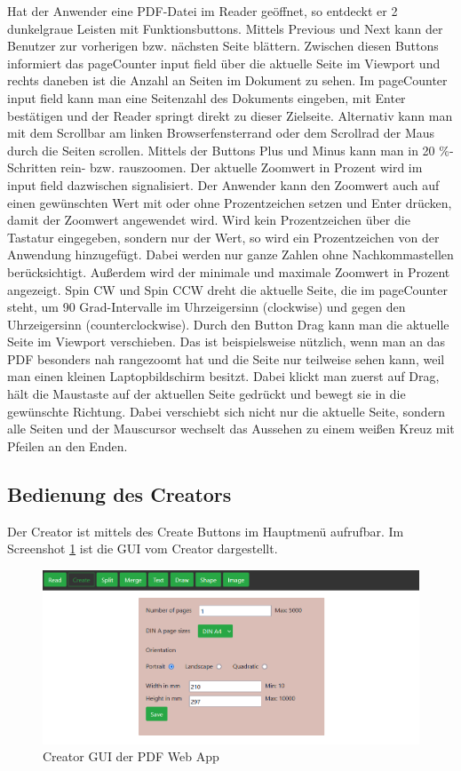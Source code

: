 Hat der Anwender eine PDF-Datei im Reader geöffnet, so entdeckt er 2 dunkelgraue Leisten mit Funktionsbuttons. Mittels Previous und Next kann der Benutzer zur vorherigen bzw. nächsten Seite blättern. Zwischen diesen Buttons informiert das pageCounter input field über die aktuelle Seite im Viewport und rechts daneben ist die Anzahl an Seiten im Dokument zu sehen. Im pageCounter input field kann man eine Seitenzahl des Dokuments eingeben, mit Enter bestätigen und der Reader springt direkt zu dieser Zielseite. Alternativ kann man mit dem Scrollbar am linken Browserfensterrand oder dem Scrollrad der Maus durch die Seiten scrollen. Mittels der Buttons Plus und Minus kann man in 20 \%-Schritten rein- bzw. rauszoomen. Der aktuelle Zoomwert in Prozent wird im input field dazwischen signalisiert. Der Anwender kann den Zoomwert auch auf einen gewünschten Wert mit oder ohne Prozentzeichen setzen und Enter drücken, damit der Zoomwert angewendet wird. Wird kein Prozentzeichen über die Tastatur eingegeben, sondern nur der Wert, so wird ein Prozentzeichen von der Anwendung hinzugefügt. Dabei werden nur ganze Zahlen ohne Nachkommastellen berücksichtigt. Außerdem wird der minimale und maximale Zoomwert in Prozent angezeigt. Spin CW und Spin CCW dreht die aktuelle Seite, die im pageCounter steht, um 90 Grad-Intervalle im Uhrzeigersinn (clockwise) und gegen den Uhrzeigersinn (counterclockwise). Durch den Button Drag kann man die aktuelle Seite im Viewport verschieben. Das ist beispielsweise nützlich, wenn man an das PDF besonders nah rangezoomt hat und die Seite nur teilweise sehen kann, weil man einen kleinen Laptopbildschirm besitzt. Dabei klickt man zuerst auf Drag, hält die Maustaste auf der aktuellen Seite gedrückt und bewegt sie in die gewünschte Richtung. Dabei verschiebt sich nicht nur die aktuelle Seite, sondern alle Seiten und der Mauscursor wechselt das Aussehen zu einem weißen Kreuz mit Pfeilen an den Enden.

\subsection{Bedienung des Creators}
Der Creator ist mittels des Create Buttons im Hauptmenü aufrufbar. Im Screenshot \ref{fig:creator} ist die GUI vom Creator dargestellt. 

\begin{figure}[!htbp]
	\centering
	\includegraphics[width=1\textwidth]{"images/creator.png"}
	\caption{Creator GUI der PDF Web App}
	\label{fig:creator}
\end{figure}

